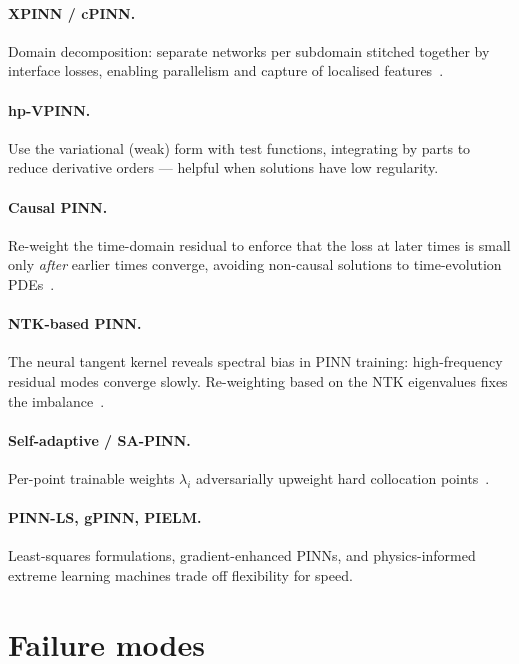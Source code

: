 \paragraph{XPINN / cPINN.}
Domain decomposition: separate networks per subdomain stitched together
by interface losses, enabling parallelism and capture of localised
features~\cite{jagtap2020xpinn}.

\paragraph{hp-VPINN.}
Use the variational (weak) form with test functions, integrating by
parts to reduce derivative orders --- helpful when solutions have low
regularity.

\paragraph{Causal PINN.}
Re-weight the time-domain residual to enforce that the loss at later
times is small only \emph{after} earlier times converge, avoiding
non-causal solutions to time-evolution PDEs~\cite{wang2022causal}.

\paragraph{NTK-based PINN.}
The neural tangent kernel reveals spectral bias in PINN training:
high-frequency residual modes converge slowly. Re-weighting based on
the NTK eigenvalues fixes the imbalance~\cite{wang2022ntkpinn}.

\paragraph{Self-adaptive / SA-PINN.}
Per-point trainable weights $\lambda_i$ adversarially upweight hard
collocation points~\cite{mcclenny2023sapinn}.

\paragraph{PINN-LS, gPINN, PIELM.}
Least-squares formulations, gradient-enhanced PINNs, and physics-informed
extreme learning machines trade off flexibility for speed.

\section{Failure modes}
\label{sec:pinn-failure}

